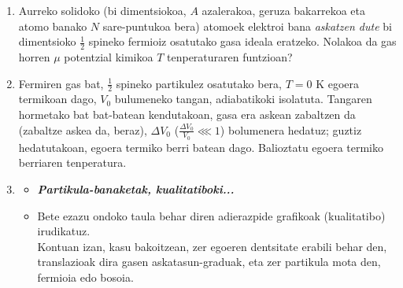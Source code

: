 \documentclass[10pt]{article}              %
\begin{document}
\begin{enumerate}
\item Aurreko solidoko (bi dimentsiokoa, $A$ azalerakoa, geruza bakarrekoa eta atomo banako $N$ sare-puntukoa bera) atomoek elektroi bana \textit{askatzen dute} bi dimentsioko $\frac{1}{2}$ spineko fermioiz osatutako gasa ideala eratzeko. Nolakoa da gas horren $\mu$ potentzial kimikoa $T$ tenperaturaren funtzioan?


\vspace{0.5cm}

\item Fermiren gas bat, $\frac{1}{2}$ spineko partikulez osatutako bera, $T=0$ K egoera termikoan dago, $V_{0}$ bulumeneko tangan, adiabatikoki isolatuta. Tangaren hormetako bat bat-batean kendutakoan, gasa era askean zabaltzen da (zabaltze askea da, beraz), $\Delta V_{0}$ ($\frac{\Delta V_{0}}{V_{0}}\lll 1$) bolumenera hedatuz; guztiz hedatutakoan, egoera termiko berri batean dago. Balioztatu egoera termiko berriaren tenperatura.
    
\vspace{0.5cm}

\item

\begin{itemize}
\item[] \textit{\textbf{Partikula-banaketak, kualitatiboki...}} 

\item[] Bete ezazu ondoko taula behar diren adierazpide grafikoak (kualitatibo) irudikatuz.\\
Kontuan izan, kasu bakoitzean, zer egoeren dentsitate erabili behar den, translazioak dira gasen askatasun-graduak, eta zer partikula mota den, fermioia edo bosoia.


\end{itemize}
\end{enumerate}
\end{document}
